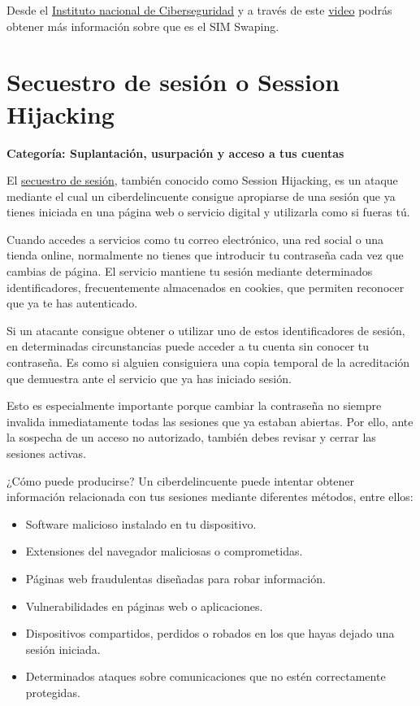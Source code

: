 \documentclass[
  spanish,
  a4paper,
  openany]{book}
\begin{document}
Desde el \href{https://www.incibe.es/}{Instituto nacional de Ciberseguridad} y a través de este \href{https://www.youtube.com/watch?v=fIaodow_nxw}{video} podrás obtener más información sobre que es el SIM Swaping.

\section{Secuestro de sesión o Session Hijacking}\label{secuestro-de-sesiuxf3n-o-session-hijacking}

\textbf{Categoría: Suplantación, usurpación y acceso a tus cuentas}

El \href{https://es.wikipedia.org/wiki/Secuestro_de_sesi\%C3\%B3n}{secuestro de sesión}, también conocido como Session Hijacking, es un ataque mediante el cual un ciberdelincuente consigue apropiarse de una sesión que ya tienes iniciada en una página web o servicio digital y utilizarla como si fueras tú.

Cuando accedes a servicios como tu correo electrónico, una red social o una tienda online, normalmente no tienes que introducir tu contraseña cada vez que cambias de página. El servicio mantiene tu sesión mediante determinados identificadores, frecuentemente almacenados en cookies, que permiten reconocer que ya te has autenticado.

Si un atacante consigue obtener o utilizar uno de estos identificadores de sesión, en determinadas circunstancias puede acceder a tu cuenta sin conocer tu contraseña. Es como si alguien consiguiera una copia temporal de la acreditación que demuestra ante el servicio que ya has iniciado sesión.

Esto es especialmente importante porque cambiar la contraseña no siempre invalida inmediatamente todas las sesiones que ya estaban abiertas. Por ello, ante la sospecha de un acceso no autorizado, también debes revisar y cerrar las sesiones activas.

¿Cómo puede producirse? Un ciberdelincuente puede intentar obtener información relacionada con tus sesiones mediante diferentes métodos, entre ellos:

\begin{itemize}
\item
  Software malicioso instalado en tu dispositivo.
\item
  Extensiones del navegador maliciosas o comprometidas.
\item
  Páginas web fraudulentas diseñadas para robar información.
\item
  Vulnerabilidades en páginas web o aplicaciones.
\item
  Dispositivos compartidos, perdidos o robados en los que hayas dejado una sesión iniciada.
\item
  Determinados ataques sobre comunicaciones que no estén correctamente protegidas.
\end{itemize}
\end{document}
